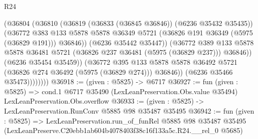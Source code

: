 \begin{lexlean}{R24}
\begin{coremodule}
                        (@36804
                          (@36810
                            (@36819 (@36833 (@36845 @36846)) (@6236 @35432 @35435))
                            (@36772
                              @383
                              @133
                              @5878
                              @5878
                              @36349
                              @5721
                              (@36826 @191 @36349 (@5975 (@36829 @191)))
                              @36846))
                          (@6236 @35442 @35447))
                        (@36772
                          @389
                          @133
                          @5878
                          @5878
                          @36481
                          @5721
                          (@36826 @237 @36481 (@5975 (@36829 @237)))
                          @36846))
                      (@6236 @35454 @35459))
                    (@36772
                      @395
                      @133
                      @5878
                      @5878
                      @36492
                      @5721
                      (@36826 @274 @36492 (@5975 (@36829 @274)))
                      @36846))
                  (@6236 @35466 @35473))))))))
@36918 := (given : @5825) -> @6717
@36927 := fun (given : @5825) =>
  cond.{1} @6717 @35490 (LexLeanPreservation.Obs.value @35494) LexLeanPreservation.Obs.overflow
@36933 := (given : @5825) -> LexLeanPreservation.RunConv @5885 @98 @35487 @35495
@36942 := fun (given : @5825) =>
  LexLeanPreservation.run_of_funRel
    @5885
    @98
    @35487
    @35495
    (LexLeanPreserve.C20ebb1ab604b4078403f38c16f133a5c.R24.__rel_0 @5685)
\end{coremodule}
\end{lexlean}

